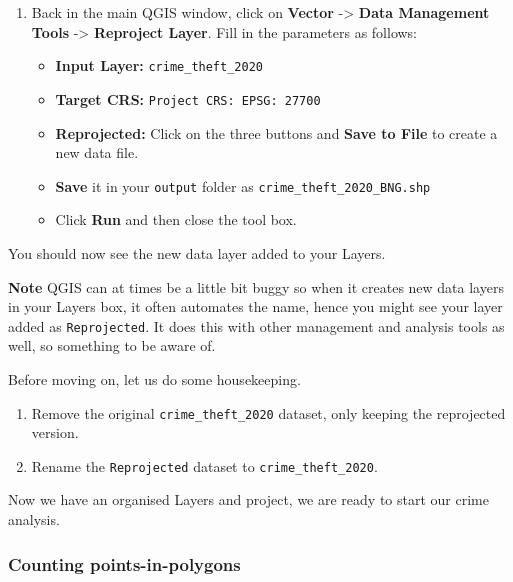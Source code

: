 \documentclass[
]{book}
\providecommand{\tightlist}{%
  \setlength{\itemsep}{0pt}\setlength{\parskip}{0pt}}
\begin{document}
\begin{enumerate}
\def\labelenumi{\arabic{enumi}.}
\setcounter{enumi}{4}
\tightlist
\item
  Back in the main QGIS window, click on \textbf{Vector} -\textgreater{} \textbf{Data Management Tools} -\textgreater{} \textbf{Reproject Layer}. Fill in the parameters as follows:

  \begin{itemize}
  \tightlist
  \item
    \textbf{Input Layer:} \texttt{crime\_theft\_2020}
  \item
    \textbf{Target CRS:} \texttt{Project\ CRS:\ EPSG:\ 27700}
  \item
    \textbf{Reprojected:} Click on the three buttons and \textbf{Save to File} to create a new data file.
  \item
    \textbf{Save} it in your \texttt{output} folder as \texttt{crime\_theft\_2020\_BNG.shp}
  \item
    Click \textbf{Run} and then close the tool box.
  \end{itemize}
\end{enumerate}

You should now see the new data layer added to your Layers.

\textbf{Note}
QGIS can at times be a little bit buggy so when it creates new data layers in your Layers box, it often automates the name, hence you might see your layer added as \texttt{Reprojected}. It does this with other management and analysis tools as well, so something to be aware of.

Before moving on, let us do some housekeeping.

\begin{enumerate}
\def\labelenumi{\arabic{enumi}.}
\setcounter{enumi}{5}
\item
  Remove the original \texttt{crime\_theft\_2020} dataset, only keeping the reprojected version.
\item
  Rename the \texttt{Reprojected} dataset to \texttt{crime\_theft\_2020}.
\end{enumerate}

Now we have an organised Layers and project, we are ready to start our crime analysis.

\hypertarget{counting-points-in-polygons}{%
\subsubsection{Counting points-in-polygons}\label{counting-points-in-polygons}}
\end{document}
